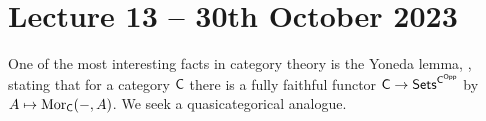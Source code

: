 \section{Lecture 13 -- 30th October 2023}
One of the most interesting facts in category theory is the Yoneda lemma, , stating that for a category $\mathsf{C}$ there is a fully faithful functor $\mathsf{C}\to\mathsf{Sets}^{\mathsf{C}^{\mathsf{Opp}}}$ by $A\mapsto\mathrm{Mor}_{\mathsf{C}}(-,A)$. We seek a quasicategorical analogue. 
